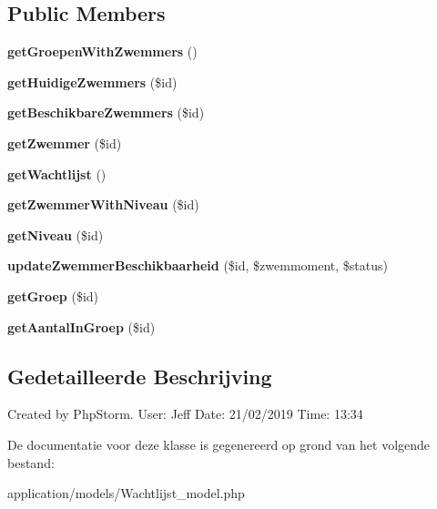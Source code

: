 \subsection*{Public Members}
\begin{DoxyCompactItemize}
\item 
\mbox{\label{class_wachtlijst__model_ae353251d817ca975738f4b96ca7e1b8e}} 
{\bfseries get\+Groepen\+With\+Zwemmers} ()
\item 
\mbox{\label{class_wachtlijst__model_a6968ba3d6c0fc3a3f45d0eb4d33704e0}} 
{\bfseries get\+Huidige\+Zwemmers} (\$id)
\item 
\mbox{\label{class_wachtlijst__model_aff28fea50a296049eec88986ace53bf4}} 
{\bfseries get\+Beschikbare\+Zwemmers} (\$id)
\item 
\mbox{\label{class_wachtlijst__model_af79e9e625210c2788d2758853e55b4dc}} 
{\bfseries get\+Zwemmer} (\$id)
\item 
\mbox{\label{class_wachtlijst__model_ae1547d418127f84ac1716210695dfac2}} 
{\bfseries get\+Wachtlijst} ()
\item 
\mbox{\label{class_wachtlijst__model_a26587ff8da438f35931664a8acc7789f}} 
{\bfseries get\+Zwemmer\+With\+Niveau} (\$id)
\item 
\mbox{\label{class_wachtlijst__model_a72ddf53e473f65f657dea78c1cd43706}} 
{\bfseries get\+Niveau} (\$id)
\item 
\mbox{\label{class_wachtlijst__model_a8cb324d159616c22f5f51863abe42346}} 
{\bfseries update\+Zwemmer\+Beschikbaarheid} (\$id, \$zwemmoment, \$status)
\item 
\mbox{\label{class_wachtlijst__model_ae73a2e1c6b2f424832286a0ef6357279}} 
{\bfseries get\+Groep} (\$id)
\item 
\mbox{\label{class_wachtlijst__model_a113b58b96e90f477bca22cf328b384d4}} 
{\bfseries get\+Aantal\+In\+Groep} (\$id)
\end{DoxyCompactItemize}


\subsection{Gedetailleerde Beschrijving}
Created by Php\+Storm. User\+: Jeff Date\+: 21/02/2019 Time\+: 13\+:34 

De documentatie voor deze klasse is gegenereerd op grond van het volgende bestand\+:\begin{DoxyCompactItemize}
\item 
application/models/Wachtlijst\+\_\+model.\+php\end{DoxyCompactItemize}
